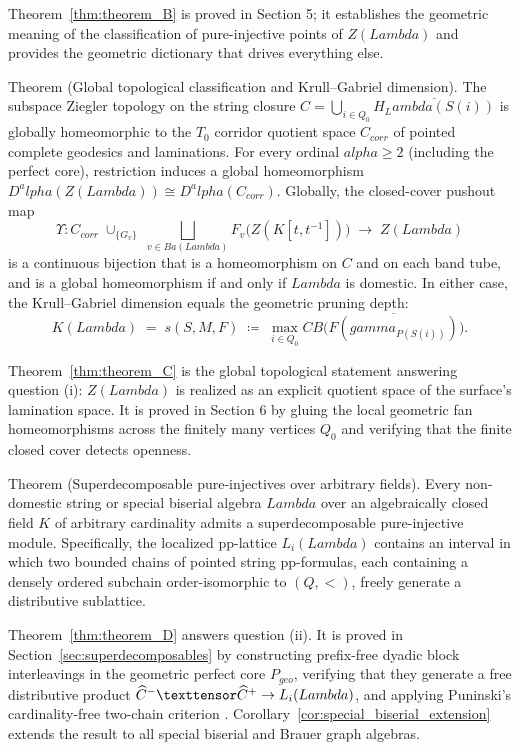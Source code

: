\documentclass[11pt,a4paper,reqno]{amsart}
\def\mathcal#1{#1}%
\def\mathbb#1{#1}%
\def\mathrm#1{#1}%
\def\operatorname#1{#1}%
\def\K{K}%
\def\forb{F}%
\def\Zg{Z}%
\def\KG{K}%
\def\CB{CB}%
\def\stgeo{s}%
\def\Dgeo{D}%
\def\otimes{\texttensor}%
\def\hookrightarrow{\to}%
\def\longrightarrow{\to}%
\def\geq{\ge}%
\def\gamma{gamma}%
\def\alpha{alpha}%
\def\Lambda{Lambda}%
\def\emph#1{#1}%
\def\textbf#1{#1}%
\theoremstyle{definition}
\theoremstyle{remark}
\newcommand{\K}{\mathbb{K}}
\newcommand{\Zg}{\operatorname{Zg}}
\newcommand{\CB}{\operatorname{CB}}
\newcommand{\KG}{\operatorname{KG}}
\newcommand{\forb}{\mathfrak{F}}
\newcommand{\Dgeo}{D_{\mathrm{geo}}}
\newcommand{\stgeo}{\operatorname{st}_{\mathrm{geo}}}
\begin{document}
\smallskip
Theorem~\ref{thm:theorem_B} is proved in Section 5; it establishes the geometric meaning of the classification of pure-injective points of $\Zg(\Lambda)$ and provides the geometric dictionary that drives everything else.

\medskip
{}%
\noindent\textbf{Theorem  (Global topological classification and Krull--Gabriel dimension).}%
\label{thm:theorem_C}
\emph{The subspace Ziegler topology on the string closure $C = \bigcup_{i \in Q_0} \overline{H_\Lambda(S(i))}$ is globally homeomorphic to the $T_0$ corridor quotient space $\mathcal{C}_{\mathrm{corr}}$ of pointed complete geodesics and laminations. For every ordinal $\alpha \geq 2$ (including the perfect core), restriction induces a global homeomorphism $D^\alpha(\Zg(\Lambda)) \cong \Dgeo^\alpha(\mathcal{C}_{\mathrm{corr}})$. Globally, the closed-cover pushout map
\[
\Upsilon \colon \mathcal{C}_{\mathrm{corr}} \;\cup_{\{G_v\}}\; \bigsqcup_{v \in \operatorname{Ba}(\Lambda)} F_v\bigl(\Zg(\K[t, t^{-1}])\bigr) \;\longrightarrow\; \Zg(\Lambda)
\]
is a continuous bijection that is a homeomorphism on $C$ and on each band tube, and is a global homeomorphism if and only if $\Lambda$ is domestic. In either case, the Krull--Gabriel dimension equals the geometric pruning depth:
\[
\KG(\Lambda) \;=\; \stgeo(\mathcal{S}, \mathcal{M}, \forb) \;\coloneqq\; \max_{i \in Q_0} \CB\bigl(\overline{\mathcal{F}(\gamma_{P(S(i))})}\bigr).
\]
}

\smallskip
Theorem~\ref{thm:theorem_C} is the global topological statement answering question (i): $\Zg(\Lambda)$ is realized as an explicit quotient space of the surface's lamination space. It is proved in Section 6 by gluing the local geometric fan homeomorphisms across the finitely many vertices $Q_0$ and verifying that the finite closed cover detects openness.

\medskip
{}%
\noindent\textbf{Theorem  (Superdecomposable pure-injectives over arbitrary fields).}%
\label{thm:theorem_D}
\emph{Every non-domestic string or special biserial algebra $\Lambda$ over an algebraically closed field $\K$ of \emph{arbitrary} cardinality admits a superdecomposable pure-injective module. Specifically, the localized pp-lattice $\mathcal{L}_i(\Lambda)$ contains an interval in which two bounded chains of pointed string pp-formulas, each containing a densely ordered subchain order-isomorphic to $(\mathbb{Q}, <)$, freely generate a distributive sublattice.}

\smallskip
Theorem~\ref{thm:theorem_D} answers question (ii). It is proved in Section~\ref{sec:superdecomposables} by constructing prefix-free dyadic block interleavings in the geometric perfect core $\mathcal{P}_{\mathrm{geo}}$, verifying that they generate a free distributive product $\widehat{\mathcal{C}}^- \otimes \widehat{\mathcal{C}}^+ \hookrightarrow \mathcal{L}_i(\Lambda)$, and applying Puninski's cardinality-free two-chain criterion \cite[Theorem~2.3]{Puninski2008}. Corollary~\ref{cor:special_biserial_extension} extends the result to all special biserial and Brauer graph algebras.
\end{document}
